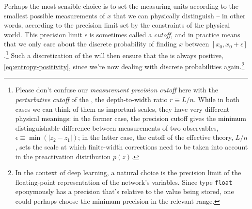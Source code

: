 Perhaps the most sensible choice is to set the measuring units according to the smallest possible measurements of $x$ that we can physically distinguish -- in other words, according to the precision limit set by the constraints of the physical world. 
This precision limit $\epsilon$ is sometimes called a \emph{cutoff}, and in practice means that we only care about the discrete probability of finding $x$ between $[x_0, x_0+\epsilon]$.\footnote{
    Please don't confuse our \emph{measurement precision cutoff} here with the \emph{perturbative cutoff} of the , the depth-to-width ratio $r \equiv L/n$. While in both cases we can think of them as important scales, they have very different physical meanings: in the former case, the precision cutoff gives the minimum distinguishable difference between measurements of two observables, $\epsilon \equiv \min(|z_2-z_1|)$; in the latter case, the cutoff of the effective theory, $L/n$, sets the scale at which finite-width corrections need to be taken into account in the preactivation distribution $p(z)$.     
}
Such a discretization of the  will then ensure that the  is always positive, \eqref{eq:entropy-positivity}, since we're now dealing with discrete probabilities again.\footnote{
    In the context of deep learning, a natural choice is the precision limit of the floating-point representation of the network's variables. Since type \texttt{float} eponymously has a precision that's relative to the value being stored, one could perhaps choose the minimum precision in the relevant range.
}











